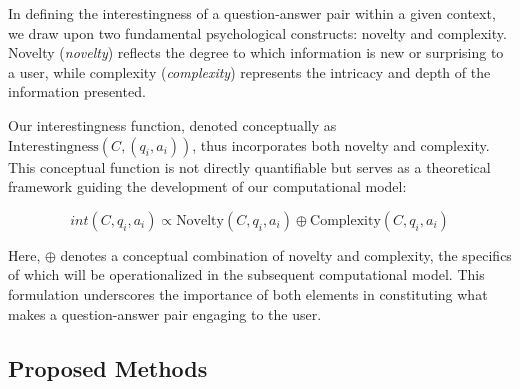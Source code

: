 \documentclass[11pt]{article}
\begin{document}



In defining the interestingness of a question-answer pair within a given context, we draw upon two fundamental psychological constructs: novelty and complexity. Novelty (\textit{novelty}) reflects the degree to which information is new or surprising to a user, while complexity (\textit{complexity}) represents the intricacy and depth of the information presented. 

Our interestingness function, denoted conceptually as \(\text{Interestingness}(C,(q_i, a_i))\), thus incorporates both novelty and complexity. This conceptual function is not directly quantifiable but serves as a theoretical framework guiding the development of our computational model:

\begin{equation}
int(C,q_i, a_i) \propto \text{Novelty}(C,q_i, a_i) \oplus \text{Complexity}(C,q_i, a_i)
\end{equation}

Here, \(\oplus\) denotes a conceptual combination of novelty and complexity, the specifics of which will be operationalized in the subsequent computational model. This formulation underscores the importance of both elements in constituting what makes a question-answer pair engaging to the user.





\subsection{Proposed Methods}
\end{document}
